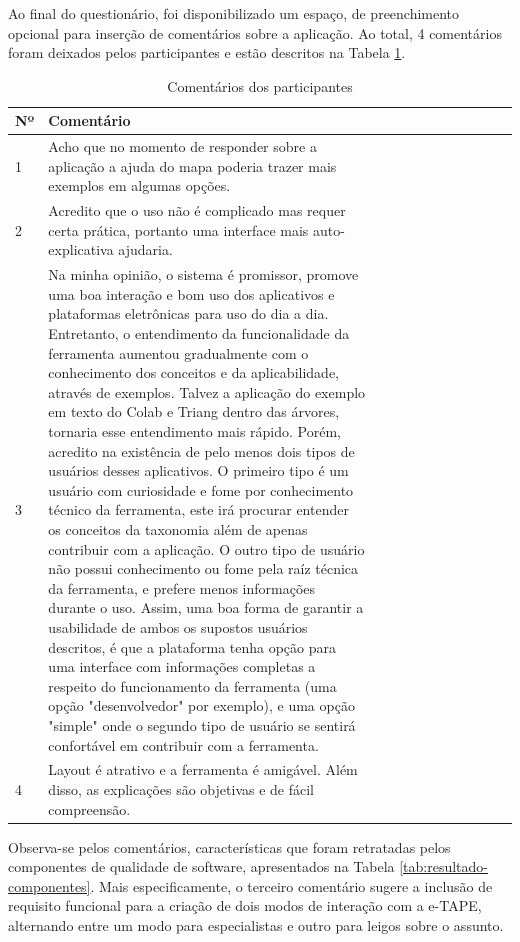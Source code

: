 Ao final do questionário, foi disponibilizado um espaço, de preenchimento opcional para  inserção de comentários sobre a aplicação. Ao total, 
4 comentários foram deixados pelos participantes e estão descritos na Tabela \ref{tab:coments}.

\pagebreak
\begin{table}[!ht]
    \centering
    \caption{Comentários dos participantes}
    \label{tab:coments}
    \begin{tabular}{l*{2}{>{\raggedright\arraybackslash}p{0.70\linewidth}}}
    \toprule
        Nº & Comentário        \\
    \midrule
        1 & Acho que no momento de responder sobre a aplicação a ajuda do mapa poderia trazer mais exemplos em algumas opções. \\
    \midrule
        2 & Acredito que o uso não é complicado mas requer certa prática, portanto uma interface mais auto-explicativa ajudaria. \\
    \midrule
        3 & Na minha opinião, o sistema é promissor, promove uma boa interação e bom uso dos aplicativos e plataformas eletrônicas para uso do dia a dia. Entretanto, o entendimento da funcionalidade da ferramenta aumentou gradualmente com o conhecimento dos conceitos e da aplicabilidade, através de exemplos. Talvez a aplicação do exemplo em texto do Colab e Triang dentro das árvores, tornaria esse entendimento mais rápido. Porém, acredito na existência de pelo menos dois tipos de usuários desses aplicativos. O primeiro tipo é um usuário com curiosidade e fome por conhecimento técnico da ferramenta, este irá procurar entender os conceitos da taxonomia além de apenas contribuir com a aplicação. O outro tipo de usuário não possui conhecimento ou fome pela raíz técnica da ferramenta, e prefere menos informações durante o uso. Assim, uma boa forma de garantir a usabilidade de ambos os supostos usuários descritos, é que a plataforma tenha opção para uma interface com informações completas a respeito do funcionamento da ferramenta (uma opção "desenvolvedor" por exemplo), e uma opção "simple" onde o segundo tipo de usuário se sentirá confortável em contribuir com a ferramenta. \\
    \midrule
        4 & Layout é atrativo e a ferramenta é amigável. Além disso, as explicações são objetivas e de fácil compreensão. \\
    \bottomrule
    \end{tabular}
\end{table}

\par
Observa-se pelos comentários, características que foram retratadas pelos componentes de qualidade de software, apresentados na Tabela \ref{tab:resultado-componentes}.
Mais especificamente, o terceiro comentário sugere a inclusão de requisito funcional para a criação de dois modos de interação com a e-TAPE, alternando entre um
modo para especialistas e outro para leigos sobre o assunto.


